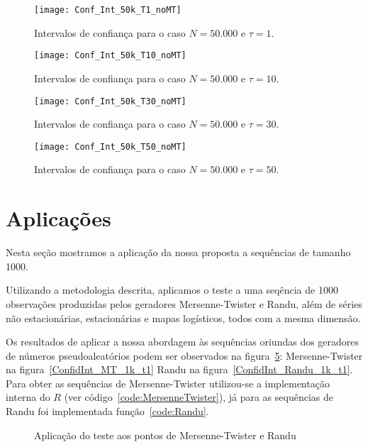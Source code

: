 \begin{figure}
	\centering
	\texttt{[image: Conf\_Int\_50k\_T1\_noMT]}
	\caption{Intervalos de confiança para o caso $N=50.000$ e $\tau=1$.}\label{Fig:Conf_Int_50k_T1}
\end{figure}

\begin{figure}
	\centering
	\texttt{[image: Conf\_Int\_50k\_T10\_noMT]}
	\caption{Intervalos de confiança para o caso $N=50.000$ e $\tau=10$.}\label{Fig:Conf_Int_50k_T10}
\end{figure}

\begin{figure}
	\centering
	\texttt{[image: Conf\_Int\_50k\_T30\_noMT]}
	\caption{Intervalos de confiança para o caso $N=50.000$ e $\tau=30$.}\label{Fig:Conf_Int_50k_30}
\end{figure}

\begin{figure}
	\centering
	\texttt{[image: Conf\_Int\_50k\_T50\_noMT]}
	\caption{Intervalos de confiança para o caso $N=50.000$ e $\tau=50$.}\label{Fig:Conf_Int_50k_T50}
\end{figure}


\section{Aplicações}

Nesta seção mostramos a aplicação da nossa proposta a sequências de tamanho \num{1000}.

Utilizando a metodologia descrita, aplicamos o teste a uma seqência de \num{1000} observações produzidas pelos geradores Mersenne-Twister e Randu, além de séries não estacionárias, estacionárias e mapas logísticos, todos com a mesma dimensão.

Os resultados de aplicar a nossa abordagem às sequências oriundas dos geradores de números pseudoaleatórios podem ser observados na figura~\ref{fig:ConfInt_PRNGs}: Mersenne-Twister na figura~\ref{ConfidInt_MT_1k_t1} Randu na figura~\ref{ConfidInt_Randu_1k_t1}.
Para obter as sequências de Mersenne-Twister utilizou-se a implementação interna do $R$ (ver código~\ref{code:MersenneTwister}),
já para as sequências de Randu foi implementada  função~\ref{code:Randu}.

\begin{figure}
	\centering
	\caption{Aplicação do teste aos pontos de Mersenne-Twister e Randu}\label{fig:ConfInt_PRNGs}
\end{figure}

